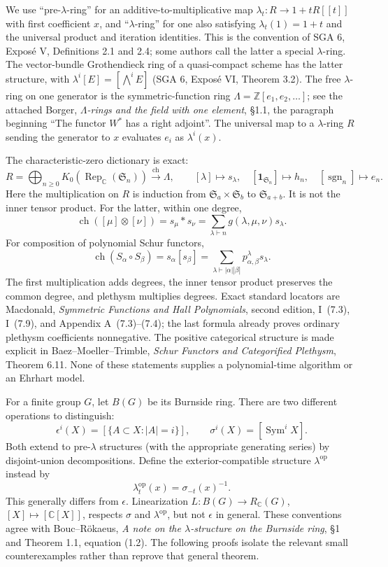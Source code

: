 \documentclass[11pt,a4paper]{article}
\begin{document}
We use ``pre-$\lambda$-ring'' for an additive-to-multiplicative map
$\lambda_t:R\longrightarrow 1+tR[[t]]$ with first coefficient $x$, and
``$\lambda$-ring'' for one also satisfying $\lambda_t(1)=1+t$ and the
universal product and iteration identities. This is the convention of SGA 6, Expos\'e V,
Definitions 2.1 and 2.4; some authors call the latter a special $\lambda$-ring.
The vector-bundle Grothendieck ring of a quasi-compact scheme has the latter
structure, with $\lambda^i[E]=[\bigwedge^iE]$ (SGA 6, Expos\'e VI,
Theorem 3.2). The free $\lambda$-ring on one generator is the symmetric-function
ring $\Lambda=\mathbb Z[e_1,e_2,\ldots]$; see the attached Borger,
\emph{$\Lambda$-rings and the field with one element}, \S1.1, the paragraph
beginning ``The functor $W^*$ has a right adjoint''. The universal map to a
$\lambda$-ring $R$ sending the generator to $x$ evaluates $e_i$ as $\lambda^i(x)$.

The characteristic-zero dictionary is exact:
\[
 R=\bigoplus_{n\geq0}K_0(\operatorname{Rep}_{\mathbb C}(\mathfrak S_n))
 \xrightarrow{\operatorname{ch}}\Lambda,
 \qquad [\lambda]\longmapsto s_\lambda,
 \quad [\mathbf1_{\mathfrak S_n}]\longmapsto h_n,
 \quad [\operatorname{sgn}_n]\longmapsto e_n.
\]
Here the multiplication on $R$ is induction from
$\mathfrak S_a\times\mathfrak S_b$ to $\mathfrak S_{a+b}$. It is not the
inner tensor product. For the latter, within one degree,
\[
 \operatorname{ch}([\mu]\otimes[\nu])=s_\mu*s_\nu
   =\sum_{\lambda\vdash n}g(\lambda,\mu,\nu)s_\lambda.
\]
For composition of polynomial Schur functors,
\[
 \operatorname{ch}(S_\alpha\circ S_\beta)=s_\alpha[s_\beta]
   =\sum_{\lambda\vdash |\alpha||\beta|}p^\lambda_{\alpha,\beta}s_\lambda.
\]
The first multiplication adds degrees, the inner tensor product preserves the
common degree, and plethysm multiplies degrees. Exact standard locators are
Macdonald, \emph{Symmetric Functions and Hall Polynomials}, second edition,
I~(7.3), I~(7.9), and Appendix A~(7.3)--(7.4); the last formula already proves
ordinary plethysm coefficients nonnegative. The positive categorical structure
is made explicit in Baez--Moeller--Trimble, \emph{Schur Functors and Categorified
Plethysm}, Theorem 6.11. None of these statements supplies a polynomial-time
algorithm or an Ehrhart model.

For a finite group $G$, let $B(G)$ be its Burnside ring. There are two different
operations to distinguish:
\[
 \epsilon^i(X)=[\{A\subset X:|A|=i\}],\qquad
 \sigma^i(X)=[\operatorname{Sym}^iX].
\]
Both extend to pre-$\lambda$ structures (with the appropriate generating series)
by disjoint-union decompositions. Define the exterior-compatible structure
$\lambda^{\mathrm{op}}$ instead by
\[
 \lambda^{\mathrm{op}}_t(x)=\sigma_{-t}(x)^{-1}.
\]
This generally differs from $\epsilon$. Linearization
$L:B(G)\to R_{\mathbb C}(G)$, $[X]\mapsto[\mathbb C[X]]$, respects
$\sigma$ and $\lambda^{\mathrm{op}}$, but not $\epsilon$ in general.
These conventions agree with Bouc--R\"okaeus,
\emph{A note on the $\lambda$-structure on the Burnside ring},
\S1 and Theorem 1.1, equation (1.2). The following proofs isolate the relevant
small counterexamples rather than reprove that general theorem.
\end{document}
